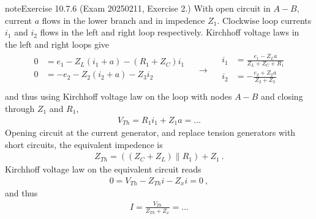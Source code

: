 \documentclass[letterpaper,10pt,italian]{jupyterBook}
\begin{document}
\begin{sphinxadmonition}{note}{Exercise 10.7.6 (Exam 2025\sphinxhyphen{}02\sphinxhyphen{}11, Exercise 2.)}
\sphinxAtStartPar
{} With open circuit in \(A-B\), current \(a\) flows in the lower branch and in impedence \(Z_1\). Clockwise loop currents \(i_1\) and \(i_2\) flows in the left and right loop respectively. Kirchhoff voltage laws in the left and right loops give
\begin{equation*}
\begin{split}\begin{aligned}
  0 & = e_1 - Z_L (i_1 + a) - (R_1 + Z_C) i_1 \\
  0 & = -e_2 - Z_2 (i_2 + a) - Z_3 i_2 \\
\end{aligned}
\quad \rightarrow \quad
\begin{aligned}
  i_1 & = \frac{e_1 - Z_L a}{Z_L + Z_C + R_1} \\
  i_2 & = -\frac{e_2 + Z_2 a}{Z_2 + Z_3} \\
\end{aligned}\end{split}
\end{equation*}
\sphinxAtStartPar
and thus using Kirchhoff voltage law on the loop with nodes \(A-B\) and closing through \(Z_1\) and \(R_1\),
\begin{equation*}
\begin{split}V_{Th} = R_1 i_1 + Z_1 a = \dots\end{split}
\end{equation*}
\sphinxAtStartPar
{} Opening circuit at the current generator, and replace tension generators with short circuits, the equivalent impedence is
\begin{equation*}
\begin{split}Z_{Th} = ( (Z_C + Z_L) \parallel R_1) + Z_1 \ .\end{split}
\end{equation*}
\sphinxAtStartPar
{} Kirchhoff voltage law on the equivalent circuit reads
\begin{equation*}
\begin{split}0 = V_{Th} - Z_{Th} i - Z_{x} i = 0 \ ,\end{split}
\end{equation*}
\sphinxAtStartPar
and thus
\begin{equation*}
\begin{split}I = \frac{V_{Th}}{Z_{Th} + Z_{x}} = \dots\end{split}
\end{equation*}

\end{sphinxadmonition}
\end{document}
